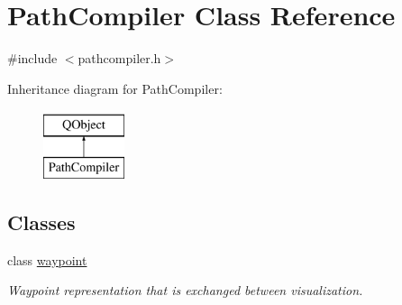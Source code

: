 \hypertarget{class_path_compiler}{\section{Path\-Compiler Class Reference}
\label{class_path_compiler}
}


{\ttfamily \#include $<$pathcompiler.\-h$>$}

Inheritance diagram for Path\-Compiler\-:\begin{figure}[H]
\begin{center}
\leavevmode
\includegraphics[height=2.000000cm]{class_path_compiler}
\end{center}
\end{figure}
\subsection*{Classes}
\begin{DoxyCompactItemize}
\item 
class \hyperlink{class_path_compiler_1_1waypoint}{waypoint}
\begin{DoxyCompactList}\small\item\em Waypoint representation that is exchanged between visualization. \end{DoxyCompactList}\end{DoxyCompactItemize}
